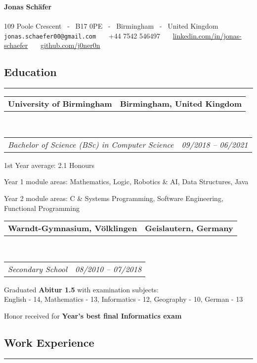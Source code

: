 \documentclass[10pt,letterpaper]{article}
\makeatletter
\newcommand{\headerrow}[2]
{\begin{tabular*}{\linewidth}{l@{\extracolsep{\fill}}r}
	#1 &
	#2 \\
\end{tabular*}}
\makeatother
\begin{document}
\begin{center}
{\LARGE \textbf{Jonas Schäfer}}
\\
\ \\
109 Poole Crescent \ - \ B17 0PE \ - \ Birmingham \ - \ United Kingdom
\\
\texttt{jonas.schaefer00@gmail.com} \ \textbullet \ \ +44 7542 546497 \ \textbullet \ \ \href{https://www.linkedin.com/in/jonas-schaefer/}{{linkedin.com/in/jonas-schaefer}} \ \textbullet \ \ \href{https://www.github.com/j0ner0n}{github.com/j0ner0n}
\end{center}

\subsection*{\Large{Education}}

\hrule
\vspace{0.4em}
\noindent
\headerrow{\textbf{University of Birmingham}}{\textbf{Birmingham, United Kingdom}}
\\
\headerrow{\emph{Bachelor of Science (BSc) in Computer Science}}{\emph{09/2018 -- 06/2021}}
\vspace{-1.6em}
\begin{itemize*}
	 \item 1st Year average: 2.1 Honours%
	 \item Year 1 module areas: Mathematics, Logic, Robotics \& AI, Data Structures, Java
	 \item Year 2 module areas: C \& Systems Programming, Software Engineering, Functional Programming
\end{itemize*}

\noindent
\headerrow{\textbf{Warndt-Gymnasium, Völklingen}}{\textbf{Geislautern, Germany}}
\\
\headerrow{\emph{Secondary School}}{\emph{08/2010 -- 07/2018}}
\vspace{-1.6em}
\begin{itemize*}
	\item Graduated \textbf{Abitur 1.5} with examination subjects:\\
       English - 14, Mathematics - 13, Informatics - 12, Geography - 10,
       German - 13
    \item Honor received for \textbf{Year's best final Informatics exam}
\end{itemize*}


\subsection*{\Large{Work Experience}}
\hrule
\vspace{0.4em}
\end{document}
